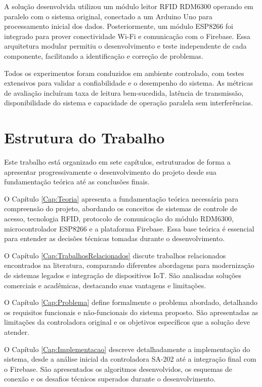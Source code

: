 A solução desenvolvida utilizou um módulo leitor RFID RDM6300 operando em paralelo com o sistema original, conectado a um Arduino Uno para processamento inicial dos dados. Posteriormente, um módulo ESP8266 foi integrado para prover conectividade Wi-Fi e comunicação com o Firebase. Essa arquitetura modular permitiu o desenvolvimento e teste independente de cada componente, facilitando a identificação e correção de problemas.

Todos os experimentos foram conduzidos em ambiente controlado, com testes extensivos para validar a confiabilidade e o desempenho do sistema. As métricas de avaliação incluíram taxa de leitura bem-sucedida, latência de transmissão, disponibilidade do sistema e capacidade de operação paralela sem interferências.

\section{Estrutura do Trabalho}

Este trabalho está organizado em sete capítulos, estruturados de forma a apresentar progressivamente o desenvolvimento do projeto desde sua fundamentação teórica até as conclusões finais.

O Capítulo \ref{Cap:Teoria} apresenta a fundamentação teórica necessária para compreensão do projeto, abordando os conceitos de sistemas de controle de acesso, tecnologia RFID, protocolo de comunicação do módulo RDM6300, microcontrolador ESP8266 e a plataforma Firebase. Essa base teórica é essencial para entender as decisões técnicas tomadas durante o desenvolvimento.

O Capítulo \ref{Cap:TrabalhosRelacionados} discute trabalhos relacionados encontrados na literatura, comparando diferentes abordagens para modernização de sistemas legados e integração de dispositivos IoT. São analisadas soluções comerciais e acadêmicas, destacando suas vantagens e limitações.

O Capítulo \ref{Cap:Problema} define formalmente o problema abordado, detalhando os requisitos funcionais e não-funcionais do sistema proposto. São apresentadas as limitações da controladora original e os objetivos específicos que a solução deve atender.

O Capítulo \ref{Cap:Implementacao} descreve detalhadamente a implementação do sistema, desde a análise inicial da controladora SA-202 até a integração final com o Firebase. São apresentados os algoritmos desenvolvidos, os esquemas de conexão e os desafios técnicos superados durante o desenvolvimento.

